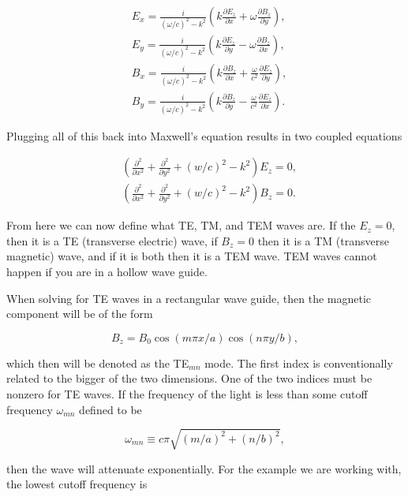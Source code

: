 \documentclass[preprint, review,12pt]{elsarticle}
\def\={\equiv}
\def\9{\left(}
\def\0{\right)}
\newcommand{\pd}[2]{\frac{\partial #1 }{\partial #2}}
\newcommand{\pds}[2]{\frac{\partial^2 #1 }{\partial {#2}^2}}
\begin{document}
\begin{equation}
\begin{split}
    & E_x = \frac{i}{(\omega/c)^2 - k^2} \9 k \pd{E_z}{x} + \omega \pd{B_z}{y} \0, \\
    & E_y = \frac{i}{(\omega/c)^2 - k^2} \9 k \pd{E_z}{y} - \omega \pd{B_z}{x} \0, \\
    & B_x = \frac{i}{(\omega/c)^2 - k^2} \9 k \pd{B_z}{x} + \frac{\omega}{c^2} \pd{E_z}{y} \0, \\
    & B_y = \frac{i}{(\omega/c)^2 - k^2} \9 k \pd{B_z}{y} - \frac{\omega}{c^2} \pd{E_z}{x} \0.
\end{split}
\end{equation}

Plugging all of this back into Maxwell's equation results in two coupled equations

\begin{equation}
\begin{split}
    & \9 \pds{}{x} + \pds{}{y} + (w/c)^2 - k^2 \0 E_z = 0, \\
    & \9 \pds{}{x} + \pds{}{y} + (w/c)^2 - k^2 \0 B_z = 0.
\end{split}
\end{equation}

From here we can now define what TE, TM, and TEM waves are. If the $E_z = 0$, then it is a TE (transverse electric) wave, if $B_z = 0$ then it is a TM (transverse magnetic) wave, and if it is both then it is a TEM wave. TEM waves cannot happen if you are in a hollow wave guide. 

When solving for TE waves in a rectangular wave guide, then the magnetic component will be of the form

\begin{equation}
    B_z = B_0 \cos(m\pi x/a)\cos(n \pi y/b),
\end{equation}

which then will be denoted as the TE$_{mn}$ mode. The first index is conventionally related to the bigger of the two dimensions. One of the two indices must be nonzero for TE waves. If the frequency of the light is less than some cutoff frequency $\omega_{mn}$ defined to be

\begin{equation}
    \omega_{mn} \= c \pi \sqrt{(m/a)^2 + (n/b)^2},
\end{equation}

then the wave will attenuate exponentially. For the example we are working with, the lowest cutoff frequency is 
\end{document}
